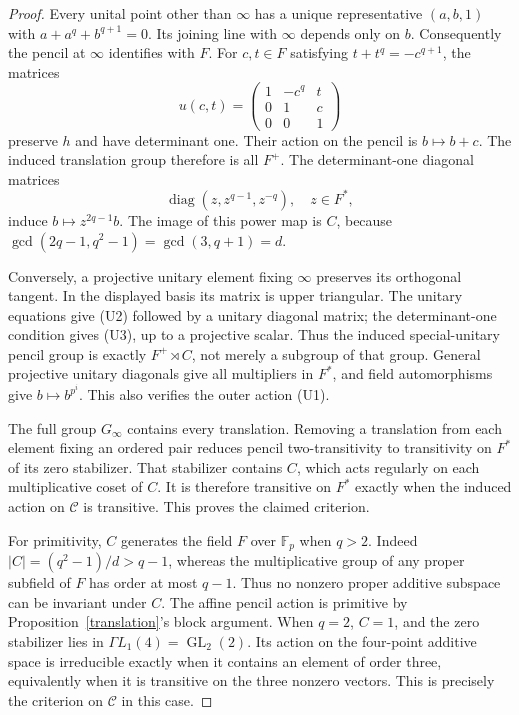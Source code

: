 \documentclass[11pt,a4paper]{article}
\newcommand{\F}{\mathbb F}
\newcommand{\GL}{\operatorname{GL}}
\begin{document}
\begin{proof}
Every unital point other than $\infty$ has a unique representative
$(a,b,1)$ with $a+a^q+b^{q+1}=0$. Its joining line with $\infty$ depends
only on $b$. Consequently the pencil at $\infty$ identifies with $F$.
For $c,t\in F$ satisfying $t+t^q=-c^{q+1}$, the matrices
\[
 u(c,t)=\begin{pmatrix}1&-c^q&t\\0&1&c\\0&0&1\end{pmatrix}
 \tag{U2}
\]
preserve $h$ and have determinant one. Their action on the pencil is
$b\mapsto b+c$. The induced translation group therefore is all $F^+$.
The determinant-one diagonal matrices
\[
 \operatorname{diag}(z,z^{q-1},z^{-q}),\quad z\in F^*,
 \tag{U3}
\]
induce $b\mapsto z^{2q-1}b$. The image of this power map is $C$, because
$\gcd(2q-1,q^2-1)=\gcd(3,q+1)=d$.

Conversely, a projective unitary element fixing $\infty$ preserves its
orthogonal tangent. In the displayed basis its matrix is upper triangular.
The unitary equations give (U2) followed by a unitary diagonal matrix;
the determinant-one condition gives (U3), up to a projective scalar.
Thus the induced special-unitary pencil group is exactly
$F^+\rtimes C$, not merely a subgroup of that group. General projective
unitary diagonals give all multipliers in $F^*$, and field automorphisms
give $b\mapsto b^{p^i}$. This also verifies the outer action (U1).

The full group $G_\infty$ contains every translation. Removing a
translation from each element fixing an ordered pair reduces
pencil two-transitivity to transitivity on $F^*$ of its zero stabilizer.
That stabilizer contains $C$, which acts regularly on each multiplicative
coset of $C$. It is therefore transitive on $F^*$ exactly when the induced
action on $\mathcal C$ is transitive. This proves the claimed criterion.

For primitivity, $C$ generates the field $F$ over $\F_p$ when $q>2$.
Indeed $|C|=(q^2-1)/d>q-1$, whereas the multiplicative group of any proper
subfield of $F$ has order at most $q-1$. Thus no nonzero proper additive
subspace can be invariant under $C$. The affine pencil action is
primitive by Proposition~\ref{translation}'s block argument. When $q=2$,
$C=1$, and the zero stabilizer lies in $\Gamma L_1(4)=\GL_2(2)$.
Its action on the four-point additive space is irreducible exactly when
it contains an element of order three, equivalently when it is transitive
on the three nonzero vectors. This is precisely the criterion on
$\mathcal C$ in this case.


\end{proof}
\end{document}
